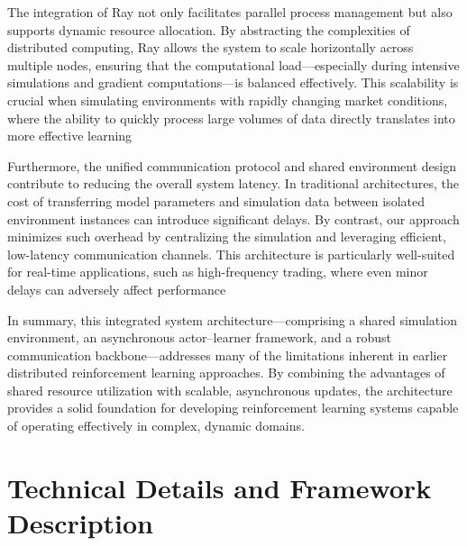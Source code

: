 The integration of Ray not only facilitates parallel process management but also supports dynamic resource allocation.
By abstracting the complexities of distributed computing, Ray allows the system to scale horizontally across multiple nodes,
ensuring that the computational load—especially during intensive simulations and gradient computations—is balanced effectively.
This scalability is crucial when simulating environments with rapidly changing market conditions,
where the ability to quickly process large volumes of data directly translates into more effective learning

Furthermore, the unified communication protocol and shared environment design contribute to reducing the overall system latency.
In traditional architectures, the cost of transferring model parameters and simulation data between isolated environment instances can
introduce significant delays. By contrast, our approach minimizes such overhead by centralizing the simulation and leveraging efficient,
low-latency communication channels.
This architecture is particularly well-suited for real-time applications, such as high-frequency trading,
where even minor delays can adversely affect performance

In summary, this integrated system architecture—comprising a shared simulation environment, an asynchronous actor–learner framework, and
a robust communication backbone—addresses many of the limitations inherent in earlier distributed reinforcement learning approaches.
By combining the advantages of shared resource utilization with scalable, asynchronous updates, the architecture provides a solid foundation for
developing reinforcement learning systems capable of operating effectively in complex, dynamic domains.


\section{Technical Details and Framework Description}
\label{sec:technical_details}


%


